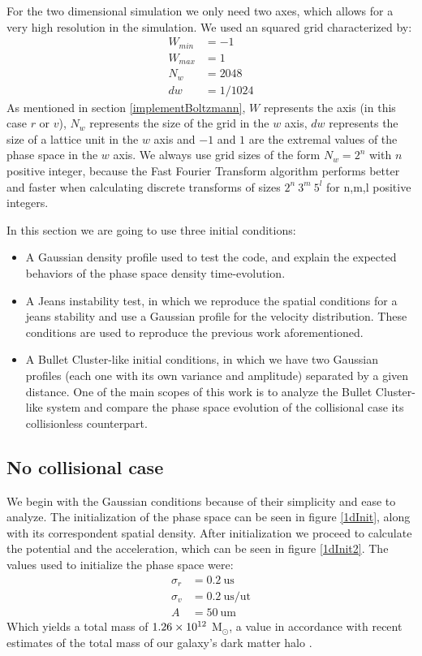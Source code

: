 For the two dimensional simulation we only need two axes, which allows for a very high resolution in the simulation. We used an squared grid characterized by:
\begin{align}
W_{min} &= -1\\
W_{max} &= 1\\
N_w &= 2048\\
dw &= 1/1024
\end{align}
As mentioned in section \ref{implementBoltzmann}, $W$ represents the axis (in this case $r$ or $v$), $N_w$ represents the size of the grid in the $w$ axis, $dw$ represents the size of a lattice unit in the $w$ axis and $-1$ and $1$ are the extremal values of the phase space in the $w$ axis.
We always use grid sizes of the form $N_w = 2^n$ with $n$ positive integer, because the Fast Fourier Transform algorithm performs better and faster when calculating discrete transforms of sizes $2^n \ 3^m \ 5^l$ for n,m,l positive integers.%

In this section we are going to use three initial conditions:
\begin{itemize}
\item A Gaussian density profile used to test the code, and explain the expected behaviors of the phase space density time-evolution.
\item A Jeans instability test, in which we reproduce the spatial conditions for a jeans stability and use a Gaussian profile for the velocity distribution. These conditions are used to reproduce the previous work aforementioned.
\item A Bullet Cluster-like initial conditions, in which we have two Gaussian profiles (each one with its own variance and amplitude) separated by a given distance. One of the main scopes of this work is to analyze the Bullet Cluster-like system and compare the phase space evolution of the collisional case its collisionless counterpart.
\end{itemize}
\subsection{No collisional case}
We begin with the Gaussian conditions because of their simplicity and ease to analyze.
The initialization of the phase space can be seen in figure \ref{1dInit}, along with its correspondent spatial density.
After initialization we proceed to calculate the potential and the acceleration, which can be seen in figure \ref{1dInit2}.
The values used to initialize the phase space were:
\begin{align}
\sigma_r &= 0.2 \ \text{us} \\
\sigma_v &= 0.2 \ \text{us} / \text{ut} \\
A &= 50  \ \text{um}
\end{align} %
Which yields a total mass of $1.26\times 10^{12}$ M$_{\odot}$, a value in accordance with recent estimates of the total mass of our galaxy's dark matter halo \cite{2013JCAP07016N}. %

